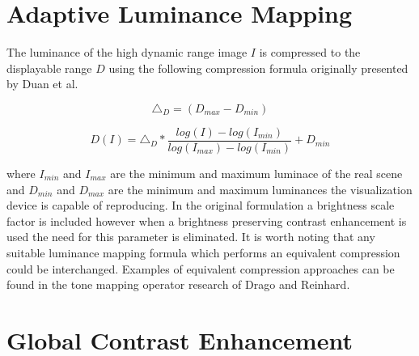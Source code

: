 \documentclass[twocolumn]{article}
\begin{document}
\section{Adaptive Luminance Mapping}

The luminance of the high dynamic range image $I$ is compressed to the displayable range $D$ using the following compression formula originally presented by Duan et al.\cite{duan05}

\begin{equation}
\triangle_D = (D_{max}-D_{min})
\end{equation}

\begin{equation}
D(I) = \triangle_D  * \frac{log(I) - log(I_{min})}{log(I_{max}) - log(I_{min})} + D_{min}
\end{equation}

where $I_{min}$ and $I_{max}$ are the minimum and maximum luminace of the real scene and $D_{min}$ and $D_{max}$ are the minimum and maximum luminances the visualization device is capable of reproducing. In the original formulation a brightness scale factor is included however when a brightness preserving contrast enhancement is used the need for this parameter is eliminated. It is worth noting that any suitable luminance mapping formula which performs an equivalent compression could be interchanged. Examples of equivalent compression approaches can be found in the tone mapping operator research of Drago\cite{drago03} and Reinhard\cite{reinhard02}.

\section{Global Contrast Enhancement}
\end{document}

